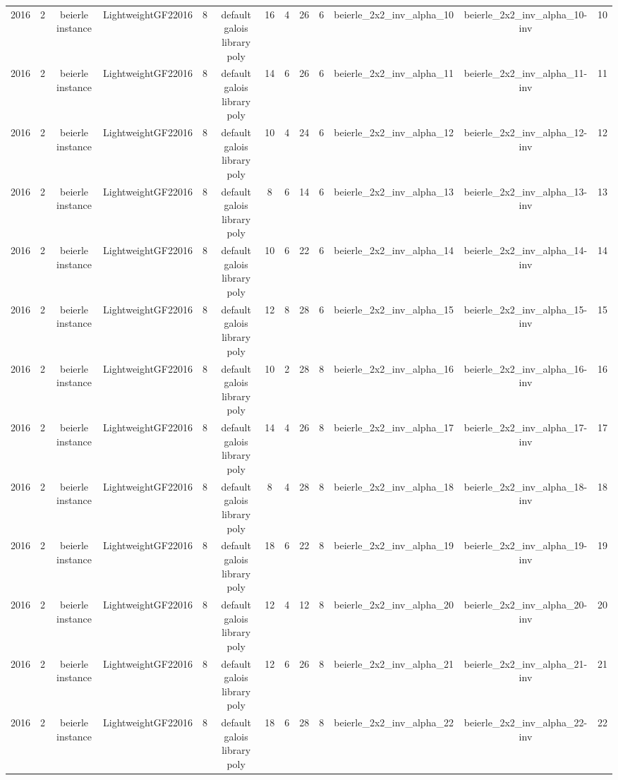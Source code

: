 \begin{tabular}{c c c c c c c c c c c c c}
2016 & 2 & beierle instance & LightweightGF22016 & 8 & default galois library poly & 16 & 4 & 26 & 6 & beierle_2x2_inv_alpha_10 & beierle_2x2_inv_alpha_10-inv & 10 \\
2016 & 2 & beierle instance & LightweightGF22016 & 8 & default galois library poly & 14 & 6 & 26 & 6 & beierle_2x2_inv_alpha_11 & beierle_2x2_inv_alpha_11-inv & 11 \\
2016 & 2 & beierle instance & LightweightGF22016 & 8 & default galois library poly & 10 & 4 & 24 & 6 & beierle_2x2_inv_alpha_12 & beierle_2x2_inv_alpha_12-inv & 12 \\
2016 & 2 & beierle instance & LightweightGF22016 & 8 & default galois library poly & 8 & 6 & 14 & 6 & beierle_2x2_inv_alpha_13 & beierle_2x2_inv_alpha_13-inv & 13 \\
2016 & 2 & beierle instance & LightweightGF22016 & 8 & default galois library poly & 10 & 6 & 22 & 6 & beierle_2x2_inv_alpha_14 & beierle_2x2_inv_alpha_14-inv & 14 \\
2016 & 2 & beierle instance & LightweightGF22016 & 8 & default galois library poly & 12 & 8 & 28 & 6 & beierle_2x2_inv_alpha_15 & beierle_2x2_inv_alpha_15-inv & 15 \\
2016 & 2 & beierle instance & LightweightGF22016 & 8 & default galois library poly & 10 & 2 & 28 & 8 & beierle_2x2_inv_alpha_16 & beierle_2x2_inv_alpha_16-inv & 16 \\
2016 & 2 & beierle instance & LightweightGF22016 & 8 & default galois library poly & 14 & 4 & 26 & 8 & beierle_2x2_inv_alpha_17 & beierle_2x2_inv_alpha_17-inv & 17 \\
2016 & 2 & beierle instance & LightweightGF22016 & 8 & default galois library poly & 8 & 4 & 28 & 8 & beierle_2x2_inv_alpha_18 & beierle_2x2_inv_alpha_18-inv & 18 \\
2016 & 2 & beierle instance & LightweightGF22016 & 8 & default galois library poly & 18 & 6 & 22 & 8 & beierle_2x2_inv_alpha_19 & beierle_2x2_inv_alpha_19-inv & 19 \\
2016 & 2 & beierle instance & LightweightGF22016 & 8 & default galois library poly & 12 & 4 & 12 & 8 & beierle_2x2_inv_alpha_20 & beierle_2x2_inv_alpha_20-inv & 20 \\
2016 & 2 & beierle instance & LightweightGF22016 & 8 & default galois library poly & 12 & 6 & 26 & 8 & beierle_2x2_inv_alpha_21 & beierle_2x2_inv_alpha_21-inv & 21 \\
2016 & 2 & beierle instance & LightweightGF22016 & 8 & default galois library poly & 18 & 6 & 28 & 8 & beierle_2x2_inv_alpha_22 & beierle_2x2_inv_alpha_22-inv & 22 \\

\end{tabular}
